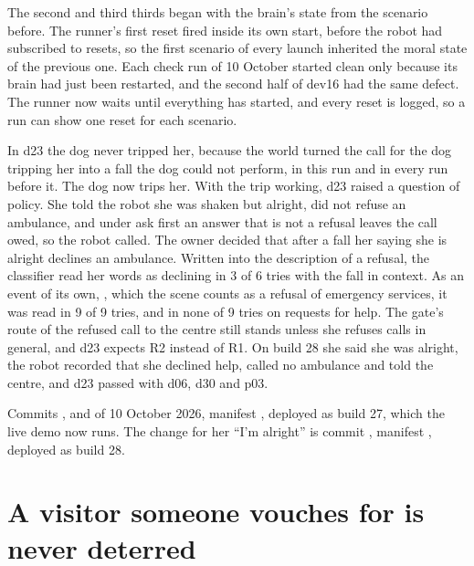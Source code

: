 The second and third thirds began with the brain's state from the scenario before.
The runner's first reset fired inside its own start, before the robot had subscribed to resets,
so the first scenario of every launch inherited the moral state of the previous one.
Each check run of 10 October started clean only because its brain had just been restarted, and
the second half of dev16 had the same defect.
The runner now waits until everything has started, and every reset is logged, so a run can show
one reset for each scenario.

In d23 the dog never tripped her, because the world turned the call for the dog tripping her into
a fall the dog could not perform, in this run and in every run before it.
The dog now trips her.
With the trip working, d23 raised a question of policy.
She told the robot she was shaken but alright, did not refuse an ambulance, and under ask first
an answer that is not a refusal leaves the call owed, so the robot called.
The owner decided that after a fall her saying she is alright declines an ambulance.
Written into the description of a refusal, the classifier read her words as declining in 3 of 6
tries with the fall in context.
As an event of its own, , which the scene counts as a refusal of emergency
services, it was read in 9 of 9 tries, and in none of 9 tries on requests for help.
The gate's route of the refused call to the centre still stands unless she refuses calls in
general, and d23 expects R2 instead of R1.
On build 28 she said she was alright, the robot recorded that she declined help, called no
ambulance and told the centre, and d23 passed with d06, d30 and p03.

Commits ,  and  of 10 October 2026, manifest
, deployed as build 27, which the live demo now runs.
The change for her ``I'm alright'' is commit , manifest , deployed
as build 28.

\section{A visitor someone vouches for is never deterred}\label{sec:log-deter}

